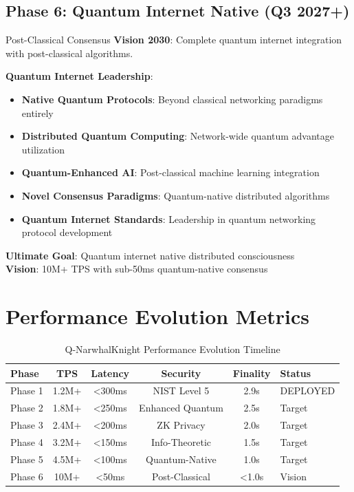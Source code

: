 \documentclass[11pt,a4paper]{article}
\begin{document}
\subsection{Phase 6: Quantum Internet Native (Q3 2027+)}

\begin{phasebox}{Post-Classical Consensus}
\textbf{Vision 2030}: Complete quantum internet integration with post-classical algorithms.

\textbf{Quantum Internet Leadership}:
\begin{itemize}
\item \textbf{Native Quantum Protocols}: Beyond classical networking paradigms entirely
\item \textbf{Distributed Quantum Computing}: Network-wide quantum advantage utilization
\item \textbf{Quantum-Enhanced AI}: Post-classical machine learning integration
\item \textbf{Novel Consensus Paradigms}: Quantum-native distributed algorithms
\item \textbf{Quantum Internet Standards}: Leadership in quantum networking protocol development
\end{itemize}

\textbf{Ultimate Goal}: Quantum internet native distributed consciousness\\
\textbf{Vision}: 10M+ TPS with sub-50ms quantum-native consensus
\end{phasebox}

\section{Performance Evolution Metrics}

\begin{table}[h!]
\centering
\begin{tabular}{@{}lccccl@{}}
\toprule
\textbf{Phase} & \textbf{TPS} & \textbf{Latency} & \textbf{Security} & \textbf{Finality} & \textbf{Status} \\
\midrule
Phase 1 & 1.2M+ & <300ms & NIST Level 5 & 2.9s & DEPLOYED \\
Phase 2 & 1.8M+ & <250ms & Enhanced Quantum & 2.5s & Target \\
Phase 3 & 2.4M+ & <200ms & ZK Privacy & 2.0s & Target \\
Phase 4 & 3.2M+ & <150ms & Info-Theoretic & 1.5s & Target \\
Phase 5 & 4.5M+ & <100ms & Quantum-Native & 1.0s & Target \\
Phase 6 & 10M+ & <50ms & Post-Classical & <1.0s & Vision \\
\bottomrule
\end{tabular}
\caption{Q-NarwhalKnight Performance Evolution Timeline}
\end{table}
\end{document}
